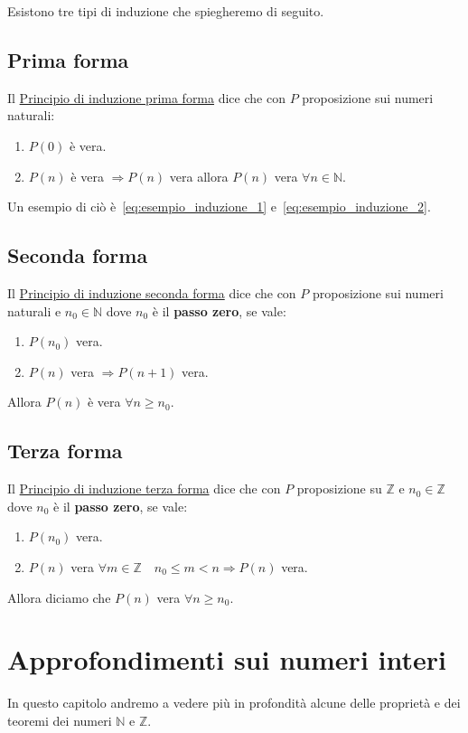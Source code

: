 \documentclass{article}
\begin{document}
Esistono tre tipi di induzione che spiegheremo di seguito.



\subsection{Prima forma}\label{sec:induzione_prima_forma}
Il \underline{Principio di induzione prima forma} dice che con $P$ proposizione sui numeri naturali:
\begin{enumerate}
        \item $P(0)$ è vera. 
        \item $P(n)$ è vera $\Rightarrow P(n)$ vera allora $P(n)$ vera $\forall n \in \mathbb{N}$. 
\end{enumerate}
Un esempio di ciò è~\ref{eq:esempio_induzione_1} e~\ref{eq:esempio_induzione_2}.



\subsection{Seconda forma}\label{sec:induzione_seconda_forma}
Il \underline{Principio di induzione seconda forma} dice che con $P$ proposizione sui numeri naturali e $n_0 \in \mathbb{N}$ dove $n_0$ è il \textbf{passo zero}, se vale:
\begin{enumerate}
        \item $P(n_0)$ vera.
        \item $P(n)$ vera $\Rightarrow P(n+1)$ vera.
\end{enumerate}
Allora $P(n)$ è vera $\forall n \ge n_0$.


\subsection{Terza forma}\label{sec:induzione_terza_forma}
Il \underline{Principio di induzione terza forma} dice che con $P$ proposizione su $\mathbb{Z}$ e $n_0 \in \mathbb{Z}$ dove $n_0$ è il \textbf{passo zero}, se vale:
\begin{enumerate}
        \item $P(n_0)$ vera. 
        \item $P(n)$ vera $\forall m \in \mathbb{Z} \quad n_0 \le m < n \Rightarrow P(n)$ vera. 
\end{enumerate}
Allora diciamo che $P(n)$ vera $\forall n \ge n_0$.






\newpage
\section{Approfondimenti sui numeri interi}\label{sec:numeri_interi}
In questo capitolo andremo a vedere più in profondità alcune delle proprietà e dei teoremi dei numeri $ \mathbb{N} $ e $ \mathbb{Z} $.   
\end{document}
